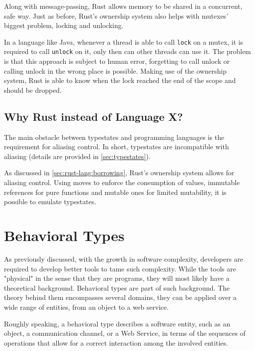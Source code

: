 Along with message-passing, Rust allows memory to be shared in a concurrent, safe way.
Just as before, Rust's ownership system also helps with mutexes' biggest problem, locking and unlocking.

In a language like Java, whenever a thread is able to call \texttt{lock} on a mutex,
it is required to call \texttt{unlock} on it, only then can other threads can use it.
The problem is that this approach is subject to human error,
forgetting to call unlock or calling unlock in the wrong place is possible.
Making use of the ownership system, Rust is able to know when the lock reached the end of the scope and should be dropped.

\subsection{Why Rust instead of Language X?}


The main obstacle between typestates and programming languages is the requirement for aliasing control.
In short, typestates are incompatible with aliasing (details are provided in \autoref{sec:typestates}).

As discussed in \autoref{sec:rust-lang:borrowing}, Rust's ownership system allows for aliasing control.
Using moves to enforce the consumption of values,
immutable references for pure functions and mutable ones for limited mutability,
it is possible to emulate typestates.

\section{Behavioral Types}\label{sec:behavioral-types}

As previously discussed, with the growth in software complexity, developers are required to develop better tools to tame such complexity.
While the tools are "physical" in the sense that they are programs, they will most likely have a theoretical background.
Behavioral types are part of such background. The theory behind them encompasses several domains,
they can be applied over a wide range of entities, from an object to a web service.

\begin{displayquote}
    Roughly speaking, a behavioral type describes a software entity, such as an object, a communication channel,
    or a Web Service, in terms of the sequences of operations that allow for a correct interaction among the involved entities.
\end{displayquote}

